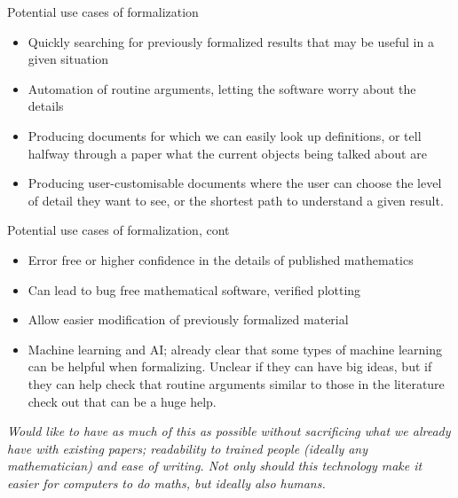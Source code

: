 \documentclass{beamer}
\theoremstyle{plain}
\begin{document}

\begin{frame}{Potential use cases of formalization}
    \begin{itemize}
    \item Quickly searching for previously formalized results that may be useful in a given situation
    \item Automation of routine arguments, letting the software worry about the details

    \item Producing documents for which we can easily look up definitions, or tell halfway through a paper what the current objects being talked about are

    \item Producing user-customisable documents where the user can choose the level of detail they want to see, or the shortest path to understand a given result.
    \end{itemize}

\end{frame}
\begin{frame}{Potential use cases of formalization, cont}

    \begin{itemize}
    \item Error free or higher confidence in the details of published mathematics

    \item Can lead to bug free mathematical software, verified plotting
    \item Allow easier modification of previously formalized material

    \item
        Machine learning and AI; already clear that some types of machine learning can be helpful when formalizing.
        Unclear if they can have big ideas, but  if they can help check that routine arguments similar to those in the literature check out that can be a huge help.
    \end{itemize}

    \emph{Would like to have as much of this as possible without sacrificing what we already have with existing papers; readability to trained people (ideally any mathematician) and ease of writing.
    Not only should this technology make it easier for computers to do maths, but ideally also humans.}
\end{frame}
\end{document}
